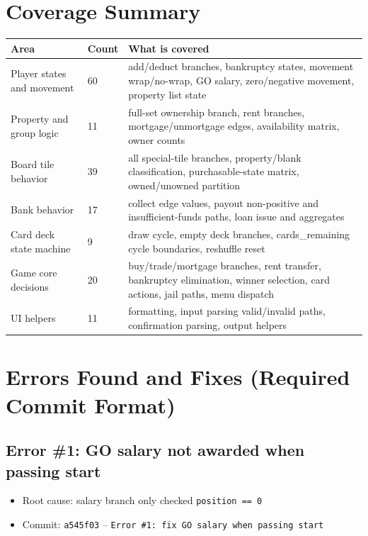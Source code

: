 \documentclass[11pt,a4paper]{article}
\begin{document}
\section*{Coverage Summary}
\begin{longtable}{|p{}|p{}|p{}|}
\hline
\textbf{Area} & \textbf{Count} & \textbf{What is covered} \\
\hline
Player states and movement & 60 & add/deduct branches, bankruptcy states, movement wrap/no-wrap, GO salary, zero/negative movement, property list state \\
\hline
Property and group logic & 11 & full-set ownership branch, rent branches, mortgage/unmortgage edges, availability matrix, owner counts \\
\hline
Board tile behavior & 39 & all special-tile branches, property/blank classification, purchasable-state matrix, owned/unowned partition \\
\hline
Bank behavior & 17 & collect edge values, payout non-positive and insufficient-funds paths, loan issue and aggregates \\
\hline
Card deck state machine & 9 & draw cycle, empty deck branches, cards\_remaining cycle boundaries, reshuffle reset \\
\hline
Game core decisions & 20 & buy/trade/mortgage branches, rent transfer, bankruptcy elimination, winner selection, card actions, jail paths, menu dispatch \\
\hline
UI helpers & 11 & formatting, input parsing valid/invalid paths, confirmation parsing, output helpers \\
\hline
\end{longtable}

\section*{Errors Found and Fixes (Required Commit Format)}

\subsection*{Error \#1: GO salary not awarded when passing start}
\begin{itemize}
  \item Root cause: salary branch only checked \texttt{position == 0}
  \item Commit: \texttt{a545f03} -- \texttt{Error \#1: fix GO salary when passing start}
\end{itemize}
\end{document}
